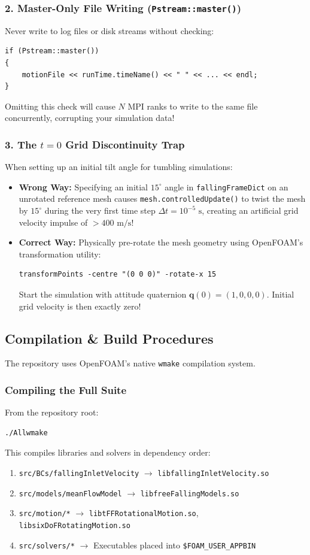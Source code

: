 \documentclass[11pt,a4paper]{article}
\newcommand{\vect}[1]{\mathbf{#1}}
\begin{document}
\subsubsection{2. Master-Only File Writing (\texttt{Pstream::master()})}
Never write to log files or disk streams without checking:
\begin{lstlisting}
if (Pstream::master())
{
    motionFile << runTime.timeName() << " " << ... << endl;
}
\end{lstlisting}
Omitting this check will cause $N$ MPI ranks to write to the same file concurrently, corrupting your simulation data!

\subsubsection{3. The \texorpdfstring{$t = 0$}{t = 0} Grid Discontinuity Trap}
When setting up an initial tilt angle for tumbling simulations:
\begin{itemize}
    \item \textbf{Wrong Way:} Specifying an initial $15^\circ$ angle in \texttt{fallingFrameDict} on an unrotated reference mesh causes \texttt{mesh.controlledUpdate()} to twist the mesh by $15^\circ$ during the very first time step $\Delta t = 10^{-5}\text{ s}$, creating an artificial grid velocity impulse of $> 400\text{ m/s}$!
    \item \textbf{Correct Way:} Physically pre-rotate the mesh geometry using OpenFOAM's transformation utility:
\begin{verbatim}
transformPoints -centre "(0 0 0)" -rotate-x 15
\end{verbatim}
    Start the simulation with attitude quaternion $\vect{q}(0) = (1, 0, 0, 0)$. Initial grid velocity is then exactly zero!
\end{itemize}

\subsection{Compilation \& Build Procedures}
The repository uses OpenFOAM's native \texttt{wmake} compilation system.

\subsubsection{Compiling the Full Suite}
From the repository root:
\begin{lstlisting}[language=bash]
./Allwmake
\end{lstlisting}
This compiles libraries and solvers in dependency order:
\begin{enumerate}
    \item \texttt{src/BCs/fallingInletVelocity} $\to$ \texttt{libfallingInletVelocity.so}
    \item \texttt{src/models/meanFlowModel} $\to$ \texttt{libfreeFallingModels.so}
    \item \texttt{src/motion/*} $\to$ \texttt{libtFFRotationalMotion.so}, \texttt{libsixDoFRotatingMotion.so}
    \item \texttt{src/solvers/*} $\to$ Executables placed into \texttt{\$FOAM\_USER\_APPBIN}
\end{enumerate}
\end{document}
